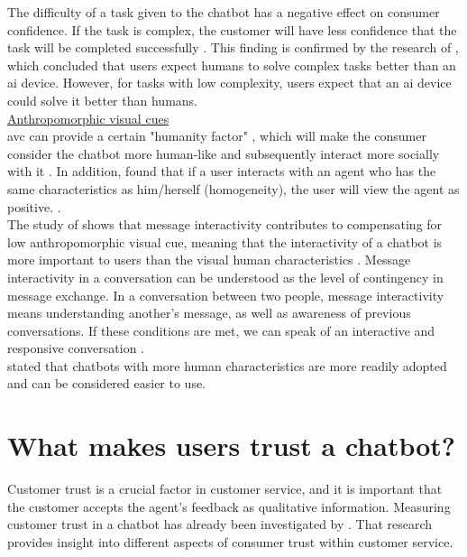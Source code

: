 The difficulty of a task given to the chatbot has a negative effect on consumer confidence. If the task is complex, the customer will have less confidence that the task will be completed successfully \citep{Cheng2021}.
This finding is confirmed by the research of \citeauthor{XU2020}, which concluded that users expect humans to solve complex tasks better than an \acrshort{ai} device. However, for tasks with low complexity, users expect that an \acrshort{ai} device could solve it better than humans. \citep{XU2020}\\
\break
\ul{Anthropomorphic visual cues}\\
\gls{avc} can provide a certain "humanity factor" \citep{Shyam2008}, which will make the consumer consider the chatbot more human-like and subsequently interact more socially with it \citep*{Go2019,Gong2007,Kim2012, Nowak2004}.
In addition, \citeauthor{Go2019,Koda1996,Wexelblat1998} found that if a user interacts with an agent who has the same characteristics as him/herself (homogeneity), the user will view the agent as positive. \citep*{Go2019,Koda1996,Wexelblat1998}.\\
\break
The study of \citeauthor{Go2019} shows that message interactivity contributes to compensating for low anthropomorphic visual cue, meaning that the interactivity of a chatbot is more important to users than the visual human characteristics \citep{Go2019}. Message interactivity in a conversation can be understood as the level of contingency in message exchange. In a conversation between two people, message interactivity means understanding another's message, as well as awareness of previous conversations. If these conditions are met, we can speak of an interactive and responsive conversation \citep*{Go2019,Sudweeks1998}.\\
\citeauthor{Sheehan2020} stated that chatbots with more human characteristics are more readily adopted and can be considered easier to use. \citep{Sheehan2020}

\section{What makes users trust a chatbot?}
Customer trust is a crucial factor in customer service, and it is important that the customer accepts the agent's feedback as qualitative information. Measuring customer trust in a chatbot has already been investigated by \citeauthor{Folstad2018}. That research provides insight into different aspects of consumer trust within customer service.

